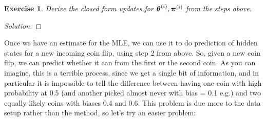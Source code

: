 \documentclass[12pt,letterpaper]{article}
\newtheorem{exercise}{Exercise}
\newenvironment{exercisesolution}
  {\begin{proof}[Solution]}
  {\end{proof}}
\begin{document}
\smallskip

\begin{exercise}
Derive the closed form updates for $\boldsymbol{\theta}^{(i)}, \boldsymbol{\pi}^{(i)}$ from the steps above.
\end{exercise}

\begin{exercisesolution}
\end{exercisesolution}
\vspace{3cm}

Once we have an estimate for the MLE, we can use it to do prediction of hidden states for a new incoming coin flip, using step 2 from above. So, given a new coin flip, we can predict whether it can from the first or the second coin. As you can imagine, this is a terrible process, since we get a single bit of information, and in particular it is impossible to tell the difference between having one coin with high probability at 0.5 (and another picked almost never with bias = 0.1 e.g.) and two equally likely coins with biases 0.4 and 0.6. This problem is due more to the data setup rather than the method, so let's try an easier problem:\\
\end{document}
